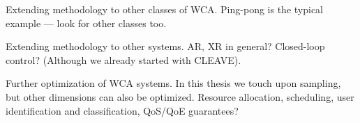 Extending methodology to other classes of \gls{WCA}.
Ping-pong is the typical example --- look for other classes too.

Extending methodology to other systems.
\gls{AR}, \gls{XR} in general?
Closed-loop control? (Although we already started with CLEAVE).

Further optimization of \gls{WCA} systems.
In this thesis we touch upon sampling, but other dimensions can also be optimized.
Resource allocation, scheduling, user identification and classification, QoS/QoE guarantees?

